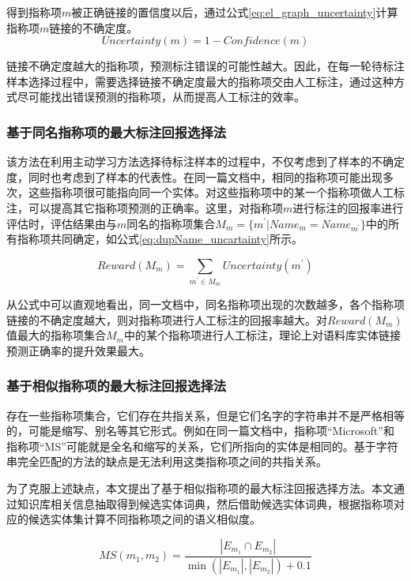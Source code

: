 得到指称项$m$被正确链接的置信度以后，通过公式\ref{eq:el_graph_uncertainty}计算指称项$m$链接的不确定度。
\begin{equation}\label{eq:el_graph_uncertainty}
Uncertainty(m)=1-Confidence(m)
\end{equation}

链接不确定度越大的指称项，预测标注错误的可能性越大。因此，在每一轮待标注样本选择过程中，需要选择链接不确定度最大的指称项交由人工标注，通过这种方式尽可能找出错误预测的指称项，从而提高人工标注的效率。

\subsubsection{基于同名指称项的最大标注回报选择法}
该方法在利用主动学习方法选择待标注样本的过程中，不仅考虑到了样本的不确定度，同时也考虑到了样本的代表性。在同一篇文档中，相同的指称项可能出现多次，这些指称项很可能指向同一个实体。对这些指称项中的某一个指称项做人工标注，可以提高其它指称项预测的正确率。这里，对指称项$m$进行标注的回报率进行评估时，评估结果由与$m$同名的指称项集合$M_m=\{m^{'}|Name_m=Name_{m^{'}}\}$中的所有指称项共同确定，如公式\ref{eq:dupName_uncartainty}所示。

\begin{equation}\label{eq:dupName_uncartainty}
Reward(M_m)=\sum_{m^{'}\in M_m} {Uncertainty(m^{'})}
\end{equation}

从公式中可以直观地看出，同一文档中，同名指称项出现的次数越多，各个指称项链接的不确定度越大，则对指称项进行人工标注的回报率越大。对$Reward(M_m)$值最大的指称项集合$M_m$中的某个指称项进行人工标注，理论上对语料库实体链接预测正确率的提升效果最大。

\subsubsection{基于相似指称项的最大标注回报选择法}
存在一些指称项集合，它们存在共指关系，但是它们名字的字符串并不是严格相等的，可能是缩写、别名等其它形式。例如在同一篇文档中，指称项“Microsoft”和指称项“MS”可能就是全名和缩写的关系，它们所指向的实体是相同的。基于字符串完全匹配的方法的缺点是无法利用这类指称项之间的共指关系。

为了克服上述缺点，本文提出了基于相似指称项的最大标注回报选择方法。本文通过知识库相关信息抽取得到候选实体词典，然后借助候选实体词典，根据指称项对应的候选实体集计算不同指称项之间的语义相似度。

\begin{equation}\label{eq:mention_semi}
MS(m_1,m_2)=\frac{|E_{m_1}\cap E_{m_2}|}{\min(|E_{m_1}|,|E_{m_2}|)+0.1}
\end{equation}

